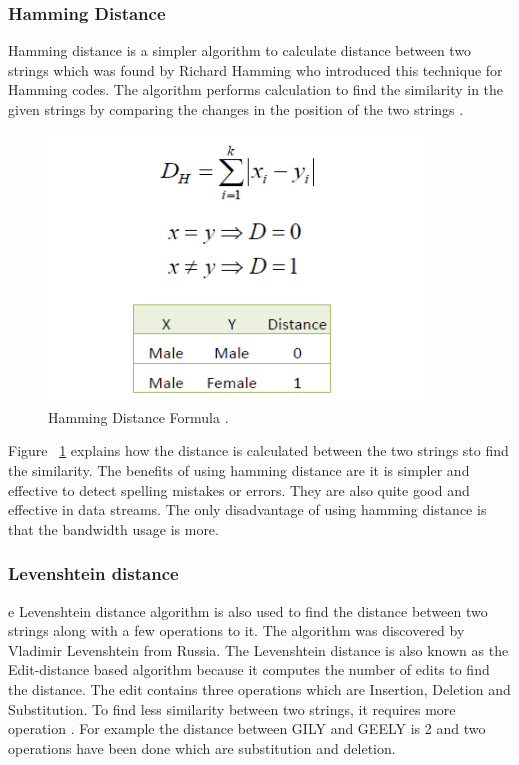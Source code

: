 \subsubsection{Hamming Distance}
Hamming distance is a simpler algorithm to calculate distance between two strings which was found by Richard Hamming who introduced this technique for Hamming codes. The algorithm performs  calculation to find the similarity in the given strings by comparing the changes in the position of the two strings \cite{Tok2015}.

\newpage
\begin{figure}[h!]
	\includegraphics[width=10cm]{includes/hamming.png}
	\centering
	\caption{ Hamming Distance Formula \cite{Saed2021}.}
	\label{fig:hamming}
\end{figure}
Figure ~\ref{fig:hamming} explains how the distance is calculated between the two strings sto find the similarity. The benefits of using hamming distance are it is simpler and effective to detect spelling mistakes or errors. They are also quite good and effective in data streams. The only disadvantage of using hamming distance is that the bandwidth usage is more.
\subsubsection{Levenshtein distance}
e Levenshtein distance algorithm is also used to find the distance between two strings along with a few operations to it. The algorithm was discovered by Vladimir Levenshtein from Russia. The Levenshtein distance is also known as the Edit-distance based algorithm because it computes the number of edits to find the distance. The edit contains three operations which are Insertion, Deletion and Substitution. To find less similarity between two strings, it requires more operation \cite{ChSa2019}. For example the distance between GILY and GEELY is 2 and two operations have been done which are substitution and deletion.

